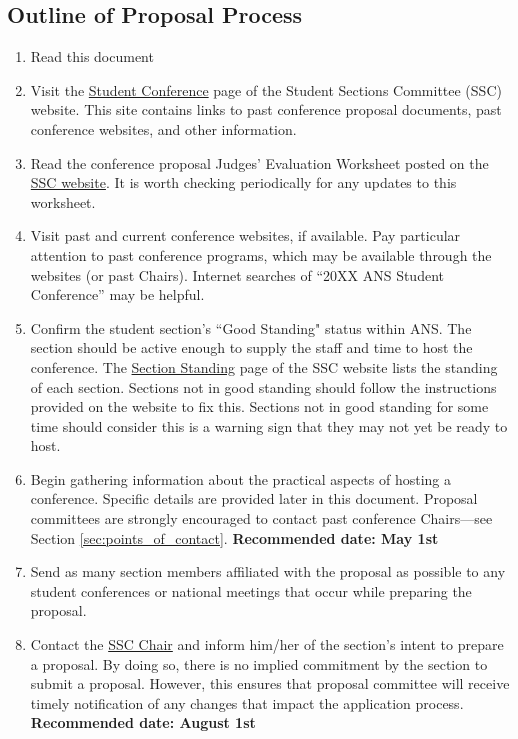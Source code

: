 \documentclass[12pt]{article}
\begin{document}
\subsection{Outline of Proposal Process}
\begin{enumerate}
\item{Read this document}
\item{Visit the \href{http://students.ans.org/student-conferences/}{Student Conference} page of the Student Sections Committee (SSC) website. This site contains links to past conference proposal documents, past conference websites, and other information.}
\item{Read the conference proposal Judges’ Evaluation Worksheet posted on the \href{http://students.ans.org/student-conferences/}{SSC website}. It is worth checking periodically for any updates to this worksheet.}
\item{Visit past and current conference websites, if available. Pay particular attention to past conference programs, which may be available through the websites (or past Chairs). Internet searches of ``20XX ANS Student Conference” may be helpful.}
\item{Confirm the student section's ``Good Standing" status within ANS. The section should be active enough to supply the staff and time to host the conference. The \href{http://students.ans.org/section-standing/}{Section Standing} page of the SSC website lists the standing of each section. Sections not in good standing should follow the instructions provided on the website to fix this. Sections not in good standing for some time should consider this is a warning sign that they may not yet be ready to host.}
\item{Begin gathering information about the practical aspects of hosting a conference. Specific details are provided later in this document. Proposal committees are strongly encouraged to contact past conference Chairs---see Section \ref{sec:points_of_contact}. \textbf{Recommended date: May 1st}}
\item{Send as many section members affiliated with the proposal as possible to any student conferences or national meetings that occur while preparing the proposal.}
\item{Contact the \href{mailto:sscChair@gmail.com}{SSC Chair} and inform him/her of the section’s intent to prepare a proposal. By doing so, there is no implied commitment by the section to submit a proposal. However, this ensures that proposal committee will receive timely notification of any changes that impact the application process. \textbf{Recommended date: August 1st}}

\end{enumerate}
\end{document}
